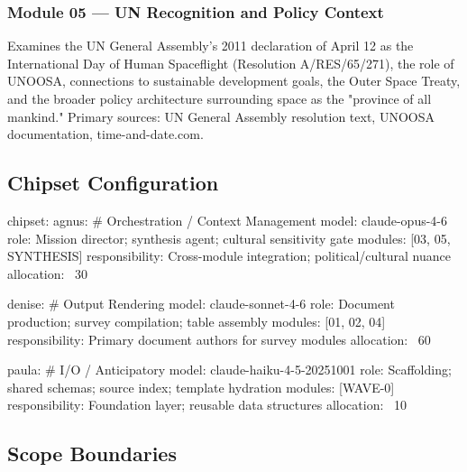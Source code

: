 \documentclass[11pt,letterpaper]{article}
\begin{document}
\subsubsection{Module 05 — UN Recognition and Policy Context}
Examines the UN General Assembly's 2011 declaration of April 12 as the International Day of Human Spaceflight (Resolution A/RES/65/271), the role of UNOOSA, connections to sustainable development goals, the Outer Space Treaty, and the broader policy architecture surrounding space as the "province of all mankind." Primary sources: UN General Assembly resolution text, UNOOSA documentation, time-and-date.com.

\subsection{Chipset Configuration}

\begin{asciibox}
chipset:
  agnus:                          # Orchestration / Context Management
    model: claude-opus-4-6
    role: Mission director; synthesis agent; cultural sensitivity gate
    modules: [03, 05, SYNTHESIS]
    responsibility: Cross-module integration; political/cultural nuance
    allocation: ~30%

  denise:                         # Output Rendering
    model: claude-sonnet-4-6
    role: Document production; survey compilation; table assembly
    modules: [01, 02, 04]
    responsibility: Primary document authors for survey modules
    allocation: ~60%

  paula:                          # I/O / Anticipatory
    model: claude-haiku-4-5-20251001
    role: Scaffolding; shared schemas; source index; template hydration
    modules: [WAVE-0]
    responsibility: Foundation layer; reusable data structures
    allocation: ~10%
\end{asciibox}

\subsection{Scope Boundaries}
\end{document}
